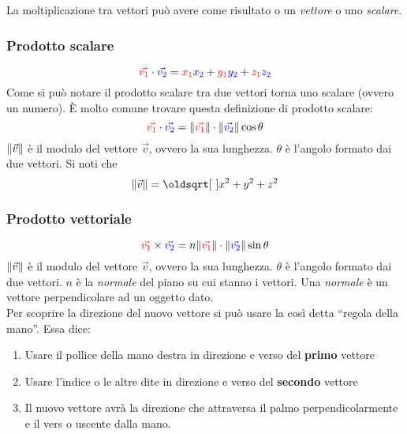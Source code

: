 La moltiplicazione tra vettori può avere come risultato o un \emph{vettore} o uno \emph{scalare}.

\subsubsection{Prodotto scalare}
\begin{equation*}
  \mathcolor{red}{\vec{v_1}} \cdot \mathcolor{blue}{\vec{v_2}} = 
  \mathcolor{red}{x_1}\mathcolor{blue}{x_2} + \mathcolor{red}{y_1}\mathcolor{blue}{y_2}+
  \mathcolor{red}{z_1}\mathcolor{blue}{z_2}
\end{equation*}
Come si può notare il prodotto scalare tra due vettori torna uno scalare (ovvero un numero).
È molto comune trovare questa definizione di prodotto scalare:
\begin{equation*}
  \mathcolor{red}{\vec{v_1}} \cdot \mathcolor{blue}{\vec{v_2}} =
  \norm{\mathcolor{red}{\vec{v_1}}}\cdot\norm{\mathcolor{blue}{\vec{v_2}}}\cos\theta
\end{equation*}
$\lVert\vec{v}\rVert$ è il modulo del vettore $\vec{v}$, ovvero la sua lunghezza. $\theta$ è l'angolo
formato dai due vettori. Si noti che
\begin{equation*}
  \norm{\vec{v}} = \sqrt{x^2+y^2+z^2} 
\end{equation*}

\subsubsection{Prodotto vettoriale}\label{subsec:vettori:prodottoVettoriale}
\begin{equation*}
  \mathcolor{red}{\vec{v_1}} \times \mathcolor{blue}{\vec{v_2}} =
  n\norm{\mathcolor{red}{\vec{v_1}}}\cdot\norm{\mathcolor{blue}{\vec{v_2}}}\sin\theta
\end{equation*}
$\lVert\vec{v}\rVert$ è il modulo del vettore $\vec{v}$, ovvero la sua lunghezza. $\theta$ è l'angolo
formato dai due vettori. $n$ è la \emph{normale} del piano su cui stanno i vettori. 
Una \emph{normale} è un vettore perpendicolare ad un oggetto dato.\\
Per scoprire la direzione del nuovo vettore si può usare la così detta ``regola della mano''. Essa 
dice:
\begin{enumerate}
  \item Usare il pollice della mano destra in direzione e verso del \textbf{primo} vettore
  \item Usare l'indice o le altre dite in direzione e verso del \textbf{secondo} vettore
  \item Il nuovo vettore avrà la direzione che attraversa il palmo perpendicolarmente e il vers
    o uscente dalla mano.
\end{enumerate}

